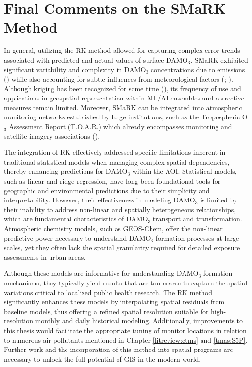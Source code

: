 \section{Final Comments on the SMaRK Method} \label{clcsn:finalcomments} In general, utilizing the RK method allowed for capturing complex error trends associated with predicted and actual values of surface DAMO$_3$. SMaRK exhibited significant variability and complexity in DAMO$_3$ concentrations due to emissions (\cite{staehle_technical_2023}) while also accounting for subtle influences from meteorological factors (\cite{danyang_ma_effect_2023}; \cite{hou_elucidating_2024}). Although kriging has been recognized for some time (\cite{chiles_fifty_2018}), its frequency of use and applications in geospatial representation within ML/AI ensembles and corrective measures remain limited. Moreover, SMaRK can be integrated into atmospheric monitoring networks established by large institutions, such as the Tropospheric O$_3$ Assessment Report (T.O.A.R.) which already encompasses monitoring and satellite imagery associations (\cite{gaudel_tropospheric_2018}). 

The integration of RK effectively addressed specific limitations inherent in traditional statistical models when managing complex spatial dependencies, thereby enhancing predictions for DAMO$_3$ within the AOI. Statistical models, such as linear and ridge regression, have long been foundational tools for geographic and environmental predictions due to their simplicity and interpretability. However, their effectiveness in modeling DAMO$_3$ is limited by their inability to address non-linear and spatially heterogeneous relationships, which are fundamental characteristics of DAMO$_3$ transport and transformation. Atmospheric chemistry models, such as GEOS-Chem, offer the non-linear predictive power necessary to understand DAMO$_3$ formation processes at large scales, yet they often lack the spatial granularity required for detailed exposure assessments in urban areas. 

Although these models are informative for understanding DAMO$_3$ formation mechanisms, they typically yield results that are too coarse to capture the spatial variations critical to localized public health research. The RK method significantly enhances these models by interpolating spatial residuals from baseline models, thus offering a refined spatial resolution suitable for high-resolution monthly and daily historical modeling. Additionally, improvements to this thesis would facilitate the appropriate tuning of monitor locations in relation to numerous air pollutants mentioned in Chapter \ref{litreview:ctms} and \ref{tmas:S5P}. Further work and the incorporation of this method into spatial programs are necessary to unlock the full potential of GIS in the modern world. 

